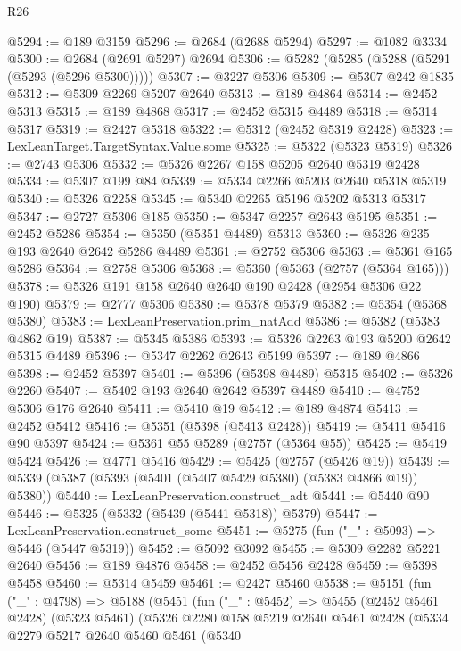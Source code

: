 \begin{lexlean}{R26}
\begin{coremodule}
@5294 := @189 @3159
@5296 := @2684 (@2688 @5294)
@5297 := @1082 @3334
@5300 := @2684 (@2691 @5297) @2694
@5306 := @5282 (@5285 (@5288 (@5291 (@5293 (@5296 @5300)))))
@5307 := @3227 @5306
@5309 := @5307 @242 @1835
@5312 := @5309 @2269 @5207 @2640
@5313 := @189 @4864
@5314 := @2452 @5313
@5315 := @189 @4868
@5317 := @2452 @5315 @4489
@5318 := @5314 @5317
@5319 := @2427 @5318
@5322 := @5312 (@2452 @5319 @2428)
@5323 := LexLeanTarget.TargetSyntax.Value.some
@5325 := @5322 (@5323 @5319)
@5326 := @2743 @5306
@5332 := @5326 @2267 @158 @5205 @2640 @5319 @2428
@5334 := @5307 @199 @84
@5339 := @5334 @2266 @5203 @2640 @5318 @5319
@5340 := @5326 @2258
@5345 := @5340 @2265 @5196 @5202 @5313 @5317
@5347 := @2727 @5306 @185
@5350 := @5347 @2257 @2643 @5195
@5351 := @2452 @5286
@5354 := @5350 (@5351 @4489) @5313
@5360 := @5326 @235 @193 @2640 @2642 @5286 @4489
@5361 := @2752 @5306
@5363 := @5361 @165 @5286
@5364 := @2758 @5306
@5368 := @5360 (@5363 (@2757 (@5364 @165)))
@5378 := @5326 @191 @158 @2640 @2640 @190 @2428 (@2954 @5306 @22 @190)
@5379 := @2777 @5306
@5380 := @5378 @5379
@5382 := @5354 (@5368 @5380)
@5383 := LexLeanPreservation.prim_natAdd
@5386 := @5382 (@5383 @4862 @19)
@5387 := @5345 @5386
@5393 := @5326 @2263 @193 @5200 @2642 @5315 @4489
@5396 := @5347 @2262 @2643 @5199
@5397 := @189 @4866
@5398 := @2452 @5397
@5401 := @5396 (@5398 @4489) @5315
@5402 := @5326 @2260
@5407 := @5402 @193 @2640 @2642 @5397 @4489
@5410 := @4752 @5306 @176 @2640
@5411 := @5410 @19
@5412 := @189 @4874
@5413 := @2452 @5412
@5416 := @5351 (@5398 (@5413 @2428))
@5419 := @5411 @5416 @90 @5397
@5424 := @5361 @55 @5289 (@2757 (@5364 @55))
@5425 := @5419 @5424
@5426 := @4771 @5416
@5429 := @5425 (@2757 (@5426 @19))
@5439 := @5339 (@5387 (@5393 (@5401 (@5407 @5429 @5380) (@5383 @4866 @19)) @5380))
@5440 := LexLeanPreservation.construct_adt
@5441 := @5440 @90
@5446 := @5325 (@5332 (@5439 (@5441 @5318)) @5379)
@5447 := LexLeanPreservation.construct_some
@5451 := @5275 (fun ("_" : @5093) => @5446 (@5447 @5319))
@5452 := @5092 @3092
@5455 := @5309 @2282 @5221 @2640
@5456 := @189 @4876
@5458 := @2452 @5456 @2428
@5459 := @5398 @5458
@5460 := @5314 @5459
@5461 := @2427 @5460
@5538 := @5151
    (fun ("_" : @4798) =>
    @5188
      (@5451
        (fun ("_" : @5452) =>
        @5455
          (@2452 @5461 @2428)
          (@5323 @5461)
          (@5326
            @2280
            @158
            @5219
            @2640
            @5461
            @2428
            (@5334
              @2279
              @5217
              @2640
              @5460
              @5461
              (@5340

\end{coremodule}
\end{lexlean}
